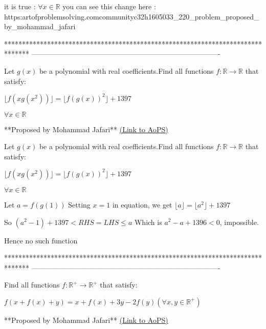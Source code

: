 \begin{solution}
	it is true : $\forall x \in \mathbb{R}$
you can see this change here :
https:\/\/artofproblemsolving.com\/community\/c32h1605033_220_problem_proposed_by_mohammad_jafari
\end{solution}
*******************************************************************************
-------------------------------------------------------------------------------

\begin{problem}
	Let $g(x)$ be a polynomial with real coefficients.Find all functions $f: \mathbb{R} \to \mathbb{R}$ that satisfy:

$\lfloor{f(xg(x^2))}\rfloor=\lfloor{f(g(x))^2}\rfloor+1397$

$\forall x \in \mathbb{R}$

**Proposed by Mohammad Jafari**
	\flushright \href{https://artofproblemsolving.com/community/c6h1611677}{(Link to AoPS)}
\end{problem}



\begin{solution}
	\begin{tcolorbox}Let $g(x)$ be a polynomial with real coefficients.Find all functions $f: \mathbb{R} \to \mathbb{R}$ that satisfy:

$\lfloor{f(xg(x^2))}\rfloor=\lfloor{f(g(x))^2}\rfloor+1397$

$\forall x \in \mathbb{R}$
\end{tcolorbox}
Let $a=f(g(1))$
Setting $x=1$ in equation, we get $\lfloor{a}\rfloor=\lfloor{a^2}\rfloor+1397$

So $(a^2-1)+1397< RHS=LHS\le a$
Which is $a^2-a+1396<0$, impossible.

Hence $\boxed{\text{no such function}}$


\end{solution}
*******************************************************************************
-------------------------------------------------------------------------------

\begin{problem}
	Find all functions $f:\mathbb{R}^{+} \to \mathbb{R}^{+}$ that satisfy:

$f(x+f(x)+y)=x+f(x)+3y-2f(y)(\forall x,y \in \mathbb{R}^{+})$

**Proposed by Mohammad Jafari**
	\flushright \href{https://artofproblemsolving.com/community/c6h1611695}{(Link to AoPS)}
\end{problem}



